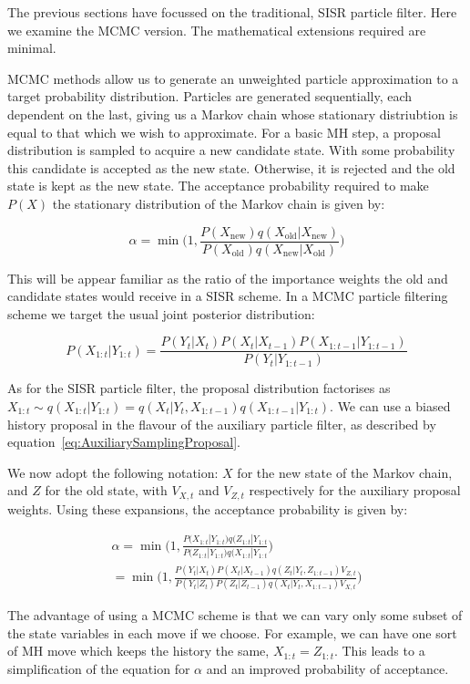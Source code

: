 The previous sections have focussed on the traditional, SISR particle filter. Here we examine the MCMC version. The mathematical extensions required are minimal.

MCMC methods allow us to generate an unweighted particle approximation to a target probability distribution. Particles are generated sequentially, each dependent on the last, giving us a Markov chain whose stationary distriubtion is equal to that which we wish to approximate. For a basic MH step, a proposal distribution is sampled to acquire a new candidate state. With some probability this candidate is accepted as the new state. Otherwise, it is rejected and the old state is kept as the new state. The acceptance probability required to make $P(X)$ the stationary distribution of the Markov chain is given by:

\begin{equation}
\alpha = \min \bigg ( 1,  \frac{ P(X_{\text{new}}) q(X_{\text{old}}|X_{\text{new}}) }{ P(X_{\text{old}}) q(X_{\text{new}}|X_{\text{old}}) }  \bigg )
\label{eq:MHAcceptance}
\end{equation}

This will be appear familiar as the ratio of the importance weights the old and candidate states would receive in a SISR scheme. In a MCMC particle filtering scheme we target the usual joint posterior distribution:

\begin{equation}
P(X_{1:t}|Y_{1:t}) = \frac{P(Y_t|X_t)P(X_t|X_{t-1})P(X_{1:t-1}|Y_{1:t-1})}{P(Y_t|Y_{1:t-1})}
\label{eq:MCMCPFTarget}
\end{equation}

As for the SISR particle filter, the proposal distribution factorises as  $X_{1:t} \sim q(X_{1:t}|Y_{1:t}) = q(X_{t}|Y_{t}, X_{1:t-1}) q(X_{1:t-1}|Y_{1:t})$. We can use a biased history proposal in the flavour of the auxiliary particle filter, as described by equation~\ref{eq:AuxiliarySamplingProposal}.

We now adopt the following notation: $X$ for the new state of the Markov chain, and $Z$ for the old state, with $V_{X,t}$ and $V_{Z,t}$ respectively for the auxiliary proposal weights. Using these expansions, the acceptance probability is given by:

\begin{multline}
\alpha = \min \bigg ( 1,  \frac{ P(X_{1:t}|Y_{1:t}) q(Z_{1:t}|Y_{1:t} }{ P(Z_{1:t}|Y_{1:t}) q(X_{1:t}|Y_{1:t} }  \bigg ) \\
= \min \bigg ( 1,  \frac{ P(Y_t|X_t)P(X_t|X_{t-1}) q(Z_t|Y_t, Z_{1:t-1}) V_{Z,t} }{ P(Y_t|Z_t)P(Z_t|Z_{t-1}) q(X_t|Y_t, X_{1:t-1}) V_{X,t} }  \bigg )
\label{eq:MCMCPFAcceptance}
\end{multline}

The advantage of using a MCMC scheme is that we can vary only some subset of the state variables in each move if we choose. For example, we can have one sort of MH move which keeps the history the same, $X_{1:t}=Z_{1:t}$. This leads to a simplification of the equation for $\alpha$ and an improved probability of acceptance.